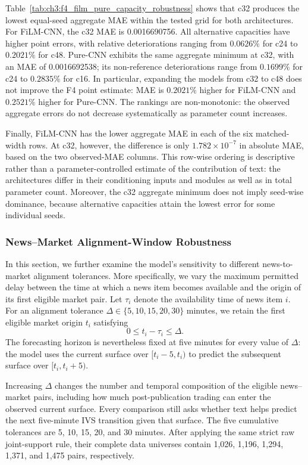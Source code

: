 Table~\ref{tab:ch3:f4_film_pure_capacity_robustness} shows that c32 produces
the lowest equal-seed aggregate MAE within the tested grid for both
architectures.  For FiLM-CNN, the c32 MAE is 0.0016690756.  All alternative
capacities have higher point errors, with relative deteriorations ranging from
$0.0626\%$ for c24 to $0.2021\%$ for c48.  Pure-CNN exhibits the same aggregate
minimum at c32, with an MAE of 0.0016692538; its non-reference deteriorations
range from $0.1699\%$ for c24 to $0.2835\%$ for c16.  In particular, expanding
the models from c32 to c48 does not improve the F4 point estimate: MAE is
$0.2021\%$ higher for FiLM-CNN and $0.2521\%$ higher for Pure-CNN.  The
rankings are non-monotonic: the observed aggregate errors do not decrease
systematically as parameter count increases.

Finally, FiLM-CNN has the lower aggregate MAE in each of the six matched-width rows.
At c32, however, the difference is only $1.782\times10^{-7}$ in absolute MAE,
based on the two observed-MAE columns.  This row-wise ordering is descriptive
rather than a parameter-controlled estimate of the contribution of text: the
architectures differ in their conditioning inputs and modules as well as in
total parameter count.  Moreover, the c32 aggregate minimum does not imply
seed-wise dominance, because alternative capacities attain the lowest error
for some individual seeds.





\subsubsection*{News--Market Alignment-Window Robustness}

In this section, we further examine the model's sensitivity to different
news-to-market alignment tolerances. More specifically, we vary the maximum permitted delay between the time at which a news item becomes available and the origin of its first eligible market pair. Let $\tau_i$ denote the availability time of news item $i$.
For an alignment tolerance $\Delta\in\{5,10,15,20,30\}$ minutes, we retain the first eligible market origin $t_i$ satisfying
\[
0 \leq t_i-\tau_i \leq \Delta.
\]
The forecasting horizon is nevertheless fixed at five minutes for every
value of $\Delta$: the model uses the current surface over
$[t_i-5,t_i)$ to predict the subsequent surface over $[t_i,t_i+5)$.

Increasing $\Delta$ changes the number and temporal composition of the
eligible news--market pairs, including how much post-publication trading can
enter the observed current surface. Every comparison still asks whether text
helps predict the next five-minute IVS transition given that surface.
The five cumulative tolerances are 5, 10, 15, 20, and 30 minutes. After applying the same strict raw joint-support rule, their complete data universes contain 1,026, 1,196, 1,294, 1,371, and 1,475 pairs, respectively.


